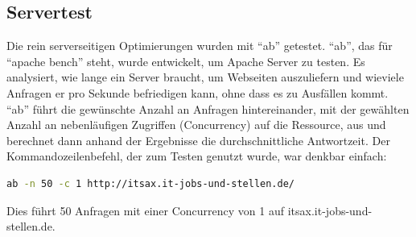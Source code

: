 \subsection{Servertest}
Die rein serverseitigen Optimierungen wurden mit "`ab"' getestet. "`ab"', das für "`apache bench"' steht, wurde entwickelt, um Apache Server zu testen. Es analysiert, wie lange ein Server braucht, um Webseiten auszuliefern und wieviele Anfragen er pro Sekunde befriedigen kann, ohne dass es zu Ausfällen kommt. "`ab"' führt die gewünschte Anzahl an Anfragen hintereinander, mit der gewählten Anzahl an nebenläufigen Zugriffen (Concurrency) auf die Ressource, aus und berechnet dann anhand der Ergebnisse die durchschnittliche Antwortzeit. Der Kommandozeilenbefehl, der zum Testen genutzt wurde, war denkbar einfach:
\begin{lstlisting}[language=bash,label="`ab"' mit Parametern,caption="`ab"' mit Parametern]
ab -n 50 -c 1 http://itsax.it-jobs-und-stellen.de/
\end{lstlisting}
Dies führt 50 Anfragen mit einer Concurrency von 1 auf itsax.it-jobs-und-stellen.de.

